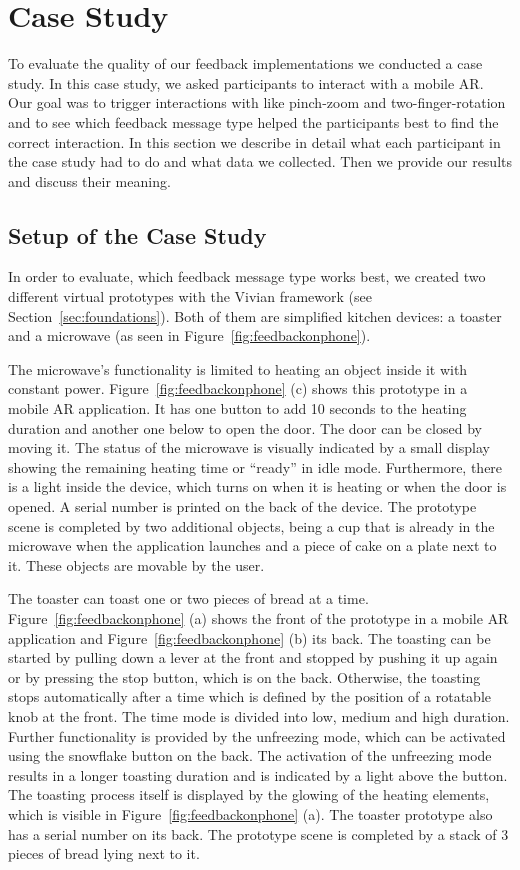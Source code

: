\documentclass[manuscript]{acmart}
\begin{document}
	\section{Case Study}\label{sec:casestudy}
		To evaluate the quality of our feedback implementations we conducted a case study. In this case study, we asked participants to interact with a mobile AR. Our goal was to trigger interactions with like pinch-zoom and two-finger-rotation and to see which feedback message type helped the participants best to find the correct interaction. In this section we describe in detail what each participant in the case study had to do and what data we collected. Then we provide our results and discuss their meaning.
		
		\subsection{Setup of the Case Study}\label{ssec:setup}
			In order to evaluate, which feedback message type works best, we created two different virtual prototypes with the Vivian framework (see Section~\ref{sec:foundations}). Both of them are simplified kitchen devices: a toaster and a microwave (as seen in Figure~\ref{fig:feedbackonphone}).

			The microwave's functionality is limited to heating an object inside it with constant power. Figure~\ref{fig:feedbackonphone} (c) shows this prototype in a mobile \ac{AR} application. It has one button to add 10 seconds to the heating duration and another one below to open the door. The door can be closed by moving it. The status of the microwave is visually indicated by a small display showing the remaining heating time or ``ready'' in idle mode. Furthermore, there is a light inside the device, which turns on when it is heating or when the door is opened. A serial number is printed on the back of the device. The prototype scene is completed by two additional objects, being a cup that is already in the microwave when the application launches and a piece of cake on a plate next to it. These objects are movable by the user.

			The toaster can toast one or two pieces of bread at a time. Figure~\ref{fig:feedbackonphone} (a) shows the front of the prototype in a mobile \ac{AR} application and Figure~\ref{fig:feedbackonphone} (b) its back. The toasting can be started by pulling down a lever at the front and stopped by pushing it up again or by pressing the stop button, which is on the back. Otherwise, the toasting stops automatically after a time which is defined by the position of a rotatable knob at the front. The time mode is divided into low, medium and high duration. Further functionality is provided by the unfreezing mode, which can be activated using the snowflake button on the back. The activation of the unfreezing mode results in a longer toasting duration and is indicated by a light above the button. The toasting process itself is displayed by the glowing of the heating elements, which is visible in Figure~\ref{fig:feedbackonphone} (a). The toaster prototype also has a serial number on its back. The prototype scene is completed by a stack of 3 pieces of bread lying next to it. 
			
\end{document}
